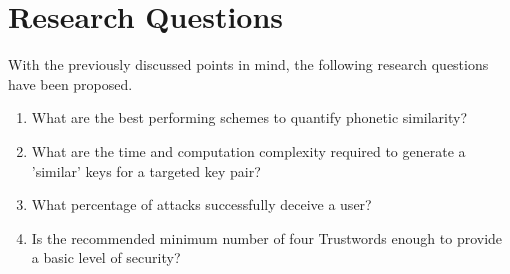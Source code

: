\section{Research Questions}

With the previously discussed points in mind, the following research questions have been proposed.

\begin{enumerate}
    \item  What are the best performing schemes to quantify phonetic similarity?  \label{goal:phoneticSimilarity}

    \item What are the time and computation complexity required to generate a 'similar' keys for a targeted key pair? \label{goal:complexity}
    
    \item What percentage of attacks successfully deceive a user? \label{goal:attackPercentage}

    \item Is the recommended minimum number of four Trustwords enough to provide a basic level of security? \label{goal:numberOfTrustwords}
\end{enumerate}
